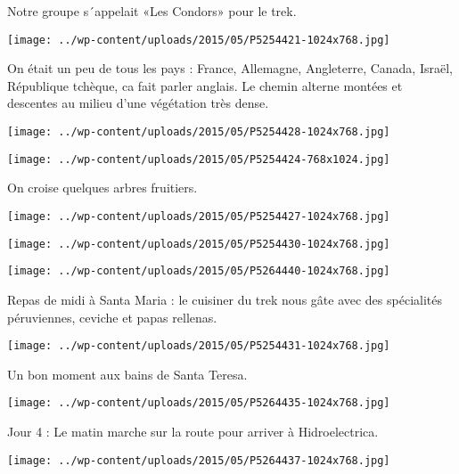  Notre groupe s´appelait «Les Condors» pour le trek. \newline
 \newline
\centerline{\texttt{[image: ../wp-content/uploads/2015/05/P5254421-1024x768.jpg]} } 
 \newline
 On était un peu de tous les pays : France, Allemagne, Angleterre, Canada, Israël, République tchèque, ca fait parler anglais. \newline
 Le chemin alterne montées et descentes au milieu d'une végétation très dense. \newline
 \newline
\centerline{\texttt{[image: ../wp-content/uploads/2015/05/P5254428-1024x768.jpg]} } 
 \newline
 \newline
\centerline{\texttt{[image: ../wp-content/uploads/2015/05/P5254424-768x1024.jpg]} } 
 \newline
 On croise quelques arbres fruitiers. \newline
 \newline
\centerline{\texttt{[image: ../wp-content/uploads/2015/05/P5254427-1024x768.jpg]} } 
 \newline
 \newline
\centerline{\texttt{[image: ../wp-content/uploads/2015/05/P5254430-1024x768.jpg]} } 
 \newline
 \newline
\centerline{\texttt{[image: ../wp-content/uploads/2015/05/P5264440-1024x768.jpg]} } 
 \newline
 Repas de midi à Santa Maria : le cuisiner du trek nous gâte avec des spécialités péruviennes, ceviche et papas rellenas. \newline
 \newline
\centerline{\texttt{[image: ../wp-content/uploads/2015/05/P5254431-1024x768.jpg]} } 
 \newline
 Un bon moment aux bains de Santa Teresa. \newline
 \newline
\centerline{\texttt{[image: ../wp-content/uploads/2015/05/P5264435-1024x768.jpg]} } 
 \newline
 Jour 4 : \newline
 Le matin marche sur la route pour arriver à Hidroelectrica. \newline
 \newline
\centerline{\texttt{[image: ../wp-content/uploads/2015/05/P5264437-1024x768.jpg]} } 
